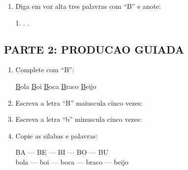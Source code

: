 \begin{exercicio}
\begin{enumerate}
  \item Diga em voz alta tres palavras com ``B'' e anote:
  \begin{center}
  1. \underline{\hspace{4cm}} . \underline{\hspace{4cm}} . \underline{\hspace{4cm}}
  \end{center}
\end{enumerate}

\subsection*{PARTE 2: PRODUCAO GUIADA}

\begin{enumerate}[resume]
  \item Complete com ``B'':
  \begin{center}
  \underline{B}ola \quad \underline{B}oi \quad \underline{B}oca \quad \underline{B}raco \quad \underline{B}eijo
  \end{center}

  \item Escreva a letra ``B'' maiuscula cinco vezes:
  \begin{center}
  \underline{\hspace{1.5cm}} \quad \underline{\hspace{1.5cm}} \quad \underline{\hspace{1.5cm}} \quad \underline{\hspace{1.5cm}} \quad \underline{\hspace{1.5cm}}
  \end{center}

  \item Escreva a letra ``b'' minuscula cinco vezes:
  \begin{center}
  \underline{\hspace{1.5cm}} \quad \underline{\hspace{1.5cm}} \quad \underline{\hspace{1.5cm}} \quad \underline{\hspace{1.5cm}} \quad \underline{\hspace{1.5cm}}
  \end{center}

  \item Copie as silabas e palavras:
  \begin{center}
  BA --- BE --- BI --- BO --- BU\\
  bola --- boi --- boca --- braco --- beijo
  \end{center}


\end{enumerate}
\end{exercicio}
